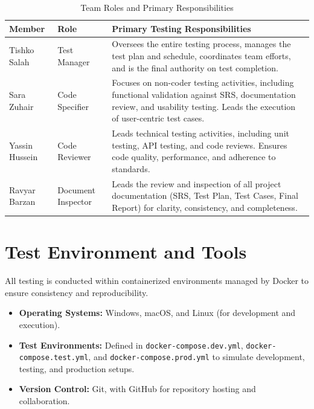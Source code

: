 \begin{table}[H]
    \centering
    \caption{Team Roles and Primary Responsibilities}
    \label{tab:team_roles}
    \begin{tabular}{|l|l|p{8cm}|}
        \hline
        \textbf{Member} & \textbf{Role} & \textbf{Primary Testing Responsibilities} \\
        \hline
        Tishko Salah & Test Manager & Oversees the entire testing process, manages the test plan and schedule, coordinates team efforts, and is the final authority on test completion. \\
        \hline
        Sara Zuhair & Code Specifier & Focuses on non-coder testing activities, including functional validation against SRS, documentation review, and usability testing. Leads the execution of user-centric test cases. \\
        \hline
        Yassin Hussein & Code Reviewer & Leads technical testing activities, including unit testing, API testing, and code reviews. Ensures code quality, performance, and adherence to standards. \\
        \hline
        Ravyar Barzan & Document Inspector & Leads the review and inspection of all project documentation (SRS, Test Plan, Test Cases, Final Report) for clarity, consistency, and completeness. \\
        \hline
    \end{tabular}
\end{table}

\section{Test Environment and Tools}
All testing is conducted within containerized environments managed by Docker to ensure consistency and reproducibility.

\begin{itemize}
    \item \textbf{Operating Systems:} Windows, macOS, and Linux (for development and execution).
    \item \textbf{Test Environments:} Defined in \texttt{docker-compose.dev.yml}, \texttt{docker-compose.test.yml}, and \texttt{docker-compose.prod.yml} to simulate development, testing, and production setups.
    \item \textbf{Version Control:} Git, with GitHub for repository hosting and collaboration.
\end{itemize}

